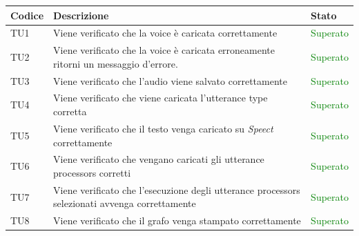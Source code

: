 \documentclass[openany,12pt,a4paper]{report}
\begin{document}
\setlength\LTleft{6mm}
\begin{longtable}[c]{| p{2.5cm} |p{8cm} | p{2.5cm} |}
	\hline
	\textbf{Codice} & \textbf{Descrizione} & \textbf{Stato}\\
	\hline
	\endhead
	\newline TU1&
	\newline Viene verificato che la voice è caricata correttamente&
	\newline \textcolor{green}{Superato}
	\\[1em]
	\hline
	\newline TU2&
	\newline Viene verificato che la voice è caricata erroneamente ritorni un messaggio d'errore.&
	\newline \textcolor{green}{Superato}
	\\[1em]
	\hline
	\newline TU3&
	\newline Viene verificato che l'audio viene salvato correttamente&
	\newline \textcolor{green}{Superato}
	\\[1em]
	\hline
	\newline TU4&
	\newline Viene verificato che viene caricata l'utterance type corretta&
	\newline \textcolor{green}{Superato}
	\\[1em]
	\hline
	\newline TU5&
	\newline Viene verificato che il testo venga caricato su \textit{Speect} correttamente&
	\newline \textcolor{green}{Superato}
	\\[1em]
	\hline
	\newline TU6&
	\newline Viene verificato che vengano caricati gli utterance processors corretti&
	\newline \textcolor{green}{Superato}
	\\[1em]
	\hline
	\newline TU7&
	\newline Viene verificato che l'esecuzione degli utterance processors selezionati avvenga correttamente&
	\newline \textcolor{green}{Superato}
	\\[1em]
	\hline
	\newline TU8&
	\newline Viene verificato che il grafo venga stampato correttamente&
	\newline \textcolor{green}{Superato}

\end{longtable}
\end{document}
